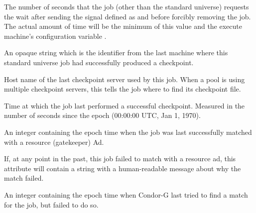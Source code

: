 \begin{description}
\item[\AdAttr{KillSigTimeout}:]  The number of seconds that the job
(other than the standard universe) requests the  wait
after sending the signal defined as  and before forcibly
removing the job.
The actual amount of time will be the minimum of this value
and the execute machine's configuration variable .

\item[\AdAttr{LastCheckpointPlatform}:]  An opaque string which is the
 identifier from the last machine where this
standard universe job had successfully produced a checkpoint.

\item[\AdAttr{LastCkptServer}:]  Host name of the last checkpoint
server used by this job.  When a pool is using multiple checkpoint
servers, this tells the job where to find its checkpoint file.

\item[\AdAttr{LastCkptTime}:]  Time at which the job last performed a
successful checkpoint.  Measured in the number of seconds since the
epoch (00:00:00 UTC, Jan 1, 1970).

\item[\AdAttr{LastMatchTime}:]  An integer containing the epoch time
when the job was last successfully matched with a resource (gatekeeper) Ad.

\item[\AdAttr{LastRejMatchReason}:]   If, at any point in the past,
this job failed to match with a resource ad,
this attribute will contain a string with a
human-readable message about why the match failed.

\item[\AdAttr{LastRejMatchTime}:]   An integer containing the epoch
time when Condor-G last tried to find a match for the job,
but failed to do so.


\end{description}
